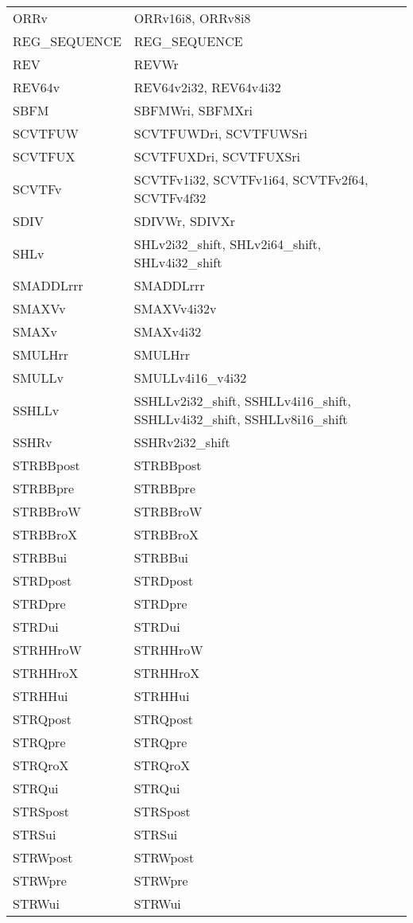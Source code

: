 \begin{xltabular}{\textwidth}{lX}
    ORRv & ORRv16i8, ORRv8i8 \\
    REG\_SEQUENCE & REG\_SEQUENCE \\
    REV & REVWr \\
    REV64v & REV64v2i32, REV64v4i32 \\
    SBFM & SBFMWri, SBFMXri \\
    SCVTFUW & SCVTFUWDri, SCVTFUWSri \\
    SCVTFUX & SCVTFUXDri, SCVTFUXSri \\
    SCVTFv & SCVTFv1i32, SCVTFv1i64, SCVTFv2f64, SCVTFv4f32 \\
    SDIV & SDIVWr, SDIVXr \\
    SHLv & SHLv2i32\_shift, SHLv2i64\_shift, SHLv4i32\_shift \\
    SMADDLrrr & SMADDLrrr \\
    SMAXVv & SMAXVv4i32v \\
    SMAXv & SMAXv4i32 \\
    SMULHrr & SMULHrr \\
    SMULLv & SMULLv4i16\_v4i32 \\
    SSHLLv & SSHLLv2i32\_shift, SSHLLv4i16\_shift, SSHLLv4i32\_shift, SSHLLv8i16\_shift \\
    SSHRv & SSHRv2i32\_shift \\
    STRBBpost & STRBBpost \\
    STRBBpre & STRBBpre \\
    STRBBroW & STRBBroW \\
    STRBBroX & STRBBroX \\
    STRBBui & STRBBui \\
    STRDpost & STRDpost \\
    STRDpre & STRDpre \\
    STRDui & STRDui \\
    STRHHroW & STRHHroW \\
    STRHHroX & STRHHroX \\
    STRHHui & STRHHui \\
    STRQpost & STRQpost \\
    STRQpre & STRQpre \\
    STRQroX & STRQroX \\
    STRQui & STRQui \\
    STRSpost & STRSpost \\
    STRSui & STRSui \\
    STRWpost & STRWpost \\
    STRWpre & STRWpre \\
    STRWui & STRWui \\

\end{xltabular}
